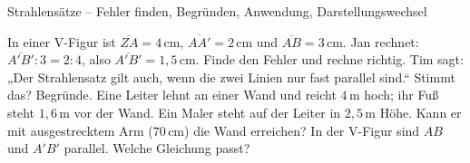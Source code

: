 \begin{aufgabe}{Strahlensätze – Fehler finden, Begründen, Anwendung, Darstellungswechsel}
\begin{teile}
\teil In einer V-Figur ist $\overline{ZA} = 4\,\text{cm}$, $\overline{AA'} = 2\,\text{cm}$ und $\overline{AB} = 3\,\text{cm}$. Jan rechnet: $\overline{A'B'} : 3 = 2 : 4$, also $\overline{A'B'} = 1{,}5\,\text{cm}$. Finde den Fehler und rechne richtig.
\teil Tim sagt: „Der Strahlensatz gilt auch, wenn die zwei Linien nur fast parallel sind.“ Stimmt das? Begründe.
\teil Eine Leiter lehnt an einer Wand und reicht $4\,\text{m}$ hoch; ihr Fuß steht $1{,}6\,\text{m}$ vor der Wand. Ein Maler steht auf der Leiter in $2{,}5\,\text{m}$ Höhe. Kann er mit ausgestrecktem Arm ($70\,\text{cm}$) die Wand erreichen?
\teil In der V-Figur sind $AB$ und $A'B'$ parallel. Welche Gleichung passt?  \\  \\ 

\end{teile}
\end{aufgabe}
